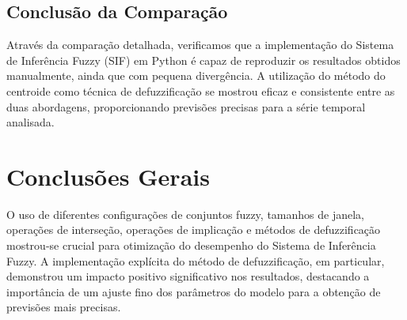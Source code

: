 \documentclass[a4paper, 12pt]{article}
\begin{document}
\subsection{Conclusão da Comparação}

Através da comparação detalhada, verificamos que a implementação do Sistema de Inferência Fuzzy (SIF) em Python é capaz de reproduzir os resultados obtidos manualmente, ainda que com pequena divergência. A utilização do método do centroide como técnica de defuzzificação se mostrou eficaz e consistente entre as duas abordagens, proporcionando previsões precisas para a série temporal analisada.



\newpage
\section{Conclusões Gerais}
O uso de diferentes configurações de conjuntos fuzzy, tamanhos de janela, operações de interseção, operações de implicação e métodos de defuzzificação mostrou-se crucial para otimização do desempenho do Sistema de Inferência Fuzzy. A implementação explícita do método de defuzzificação, em particular, demonstrou um impacto positivo significativo nos resultados, destacando a importância de um ajuste fino dos parâmetros do modelo para a obtenção de previsões mais precisas.

\newpage
\nocite{beer:ferdinand}
\nocite{janos:2005:algpseudocode}
\nocite{zandt:2010:fancyvrb}

\end{document}
